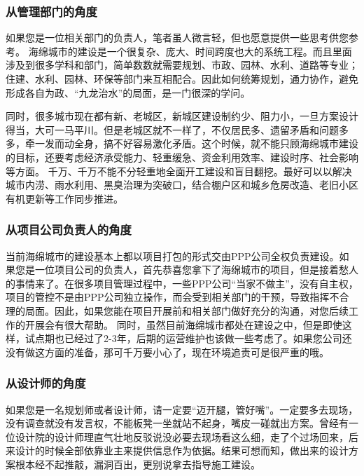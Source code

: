 \documentclass[]{book}
\begin{document}
\subsubsection{从管理部门的角度}

如果您是一位相关部门的负责人，笔者虽人微言轻，但也愿意提供一些思考供您参考。
海绵城市的建设是一个很复杂、庞大、时间跨度也大的系统工程。而且里面涉及到很多学科和部门，简单数数就需要规划、市政、园林、水利、道路等专业；住建、水利、园林、环保等部门来互相配合。因此如何统筹规划，通力协作，避免形成各自为政、``九龙治水''的局面，是一门很深的学问。

同时，很多城市现在都有新、老城区，新城区建设制约少、阻力小，一旦方案设计得当，大可一马平川。但是老城区就不一样了，不仅居民多、遗留矛盾和问题多多，牵一发而动全身，搞不好容易激化矛盾。这个时候，就不能只顾海绵城市建设的目标，还要考虑经济承受能力、轻重缓急、资金利用效率、建设时序、社会影响等方面。
千万、千万不能不分轻重地全面开工建设和盲目翻挖。最好可以以解决城市内涝、雨水利用、黑臭治理为突破口，结合棚户区和城乡危房改造、老旧小区有机更新等工作同步推进。

\subsubsection{从项目公司负责人的角度}

当前海绵城市的建设基本上都以项目打包的形式交由PPP公司全权负责建设。如果您是一位项目公司的负责人，首先恭喜您拿下了海绵城市的项目，但是接着愁人的事情来了。在很多项目管理过程中，一些PPP公司``当家不做主''，没有自主权，项目的管控不是由PPP公司独立操作，而会受到相关部门的干预，导致指挥不合理的局面。因此，如果您能在项目开展前和相关部门做好充分的沟通，对您后续工作的开展会有很大帮助。
同时，虽然目前海绵城市都处在建设之中，但是即使这样，试点期也已经过了2-3年，后期的运营维护也该做一些考虑了。如果您公司还没有做这方面的准备，那可千万要小心了，现在环境追责可是很严重的哦。

\subsubsection{从设计师的角度}

如果您是一名规划师或者设计师，请一定要``迈开腿，管好嘴''。一定要多去现场，没有调查就没有发言权，不能板凳一坐就站不起身，嘴皮一碰就出方案。曾经有一位设计院的设计师理直气壮地反驳说没必要去现场看这么细，走了个过场回来，后来设计的时候全部依靠业主来提供信息作为依据。结果可想而知，做出来的设计方案根本经不起推敲，漏洞百出，更别说拿去指导施工建设。
\end{document}
